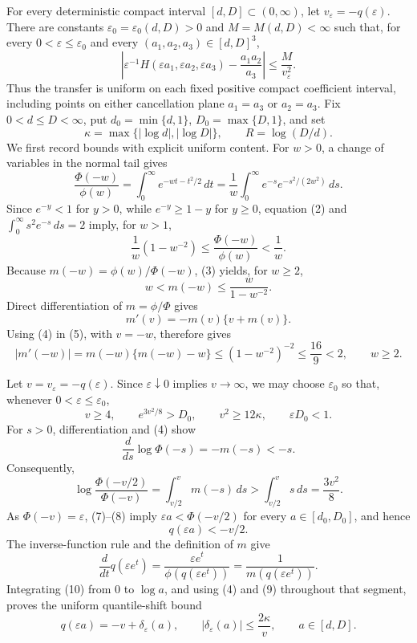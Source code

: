 For every deterministic compact interval \([d,D]\subset(0,\infty)\), let \(v_\varepsilon=-q(\varepsilon)\).  There are constants \(\varepsilon_0=\varepsilon_0(d,D)>0\) and \(M=M(d,D)<\infty\) such that, for every \(0<\varepsilon\leq\varepsilon_0\) and every \((a_1,a_2,a_3)\in[d,D]^3\),
\[
\left|\varepsilon^{-1}H(\varepsilon a_1,\varepsilon a_2,\varepsilon a_3)-\frac{a_1a_2}{a_3}\right|
\leq \frac{M}{v_\varepsilon^2}.
\]
Thus the transfer is uniform on each fixed positive compact coefficient interval, including points on either cancellation plane \(a_1=a_3\) or \(a_2=a_3\).
Fix \(0<d\leq D<\infty\), put \(d_0=\min\{d,1\}\), \(D_0=\max\{D,1\}\), and set
\[
\kappa=\max\{|\log d|,|\log D|\},
\qquad R=\log(D/d).
\tag{1}
\]
We first record bounds with explicit uniform content.  For \(w>0\), a change of variables in the normal tail gives
\[
\frac{\Phi(-w)}{\phi(w)}
=\int_0^\infty e^{-wt-t^2/2}\,dt
=\frac1w\int_0^\infty e^{-s}e^{-s^2/(2w^2)}\,ds.
\tag{2}
\]
Since \(e^{-y}<1\) for \(y>0\), while \(e^{-y}\geq1-y\) for \(y\geq0\), equation (2) and
\(\int_0^\infty s^2e^{-s}\,ds=2\) imply, for \(w>1\),
\[
\frac1w(1-w^{-2})
\leq \frac{\Phi(-w)}{\phi(w)}<\frac1w.
\tag{3}
\]
Because \(m(-w)=\phi(w)/\Phi(-w)\), (3) yields, for \(w\geq2\),
\[
w<m(-w)\leq\frac{w}{1-w^{-2}}.
\tag{4}
\]
Direct differentiation of \(m=\phi/\Phi\) gives
\[
m'(v)=-m(v)\{v+m(v)\}.
\tag{5}
\]
Using (4) in (5), with \(v=-w\), therefore gives
\[
|m'(-w)|=m(-w)\{m(-w)-w\}
\leq(1-w^{-2})^{-2}\leq\frac{16}{9}<2,
\qquad w\geq2.
\tag{6}
\]

Let \(v=v_\varepsilon=-q(\varepsilon)\).  Since \(\varepsilon\downarrow0\) implies \(v\to\infty\), we may choose \(\varepsilon_0\) so that, whenever \(0<\varepsilon\leq\varepsilon_0\),
\[
v\geq4,
\qquad e^{3v^2/8}>D_0,
\qquad v^2\geq12\kappa,
\qquad \varepsilon D_0<1.
\tag{7}
\]
For \(s>0\), differentiation and (4) show
\[
\frac{d}{ds}\log\Phi(-s)=-m(-s)<-s.
\]
Consequently,
\[
\log\frac{\Phi(-v/2)}{\Phi(-v)}
=\int_{v/2}^{v}m(-s)\,ds
>\int_{v/2}^{v}s\,ds
=\frac{3v^2}{8}.
\tag{8}
\]
As \(\Phi(-v)=\varepsilon\), (7)--(8) imply
\(\varepsilon a<\Phi(-v/2)\) for every \(a\in[d_0,D_0]\), and hence
\[
q(\varepsilon a)<-v/2.
\tag{9}
\]
The inverse-function rule and the definition of \(m\) give
\[
\frac{d}{dt}q(\varepsilon e^t)
=\frac{\varepsilon e^t}{\phi(q(\varepsilon e^t))}
=\frac1{m(q(\varepsilon e^t))}.
\tag{10}
\]
Integrating (10) from \(0\) to \(\log a\), and using (4) and (9) throughout that segment, proves the uniform quantile-shift bound
\[
q(\varepsilon a)=-v+\delta_\varepsilon(a),
\qquad
|\delta_\varepsilon(a)|\leq\frac{2\kappa}{v},
\qquad a\in[d,D].
\tag{11}
\]

